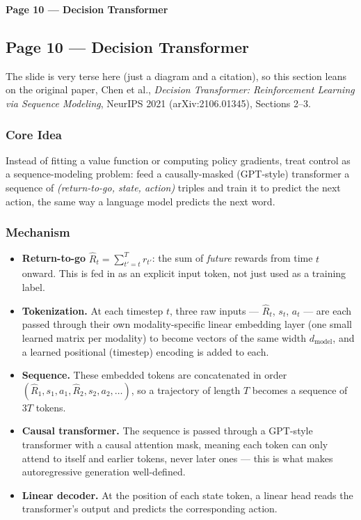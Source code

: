 \bigskip

\textbf{Page 10 --- Decision Transformer}

\subsection*{Page 10 --- Decision Transformer}

The slide is very terse here (just a diagram and a citation), so this section leans on the original paper, Chen et al., \emph{Decision Transformer: Reinforcement Learning via Sequence Modeling}, NeurIPS 2021 (arXiv:2106.01345), Sections 2--3.

\subsubsection*{Core Idea}

Instead of fitting a value function or computing policy gradients, treat control as a sequence-modeling problem: feed a causally-masked (GPT-style) transformer a sequence of \emph{(return-to-go, state, action)} triples and train it to predict the next action, the same way a language model predicts the next word.

\subsubsection*{Mechanism}

\begin{itemize}
\item \textbf{Return-to-go} $\hat R_t = \sum_{t'=t}^{T} r_{t'}$: the sum of \emph{future} rewards from time $t$ onward. This is fed in as an explicit input token, not just used as a training label.
\item \textbf{Tokenization.} At each timestep $t$, three raw inputs --- $\hat R_t$, $s_t$, $a_t$ --- are each passed through their own modality-specific linear embedding layer (one small learned matrix per modality) to become vectors of the same width $d_{\text{model}}$, and a learned positional (timestep) encoding is added to each.
\item \textbf{Sequence.} These embedded tokens are concatenated in order $(\hat R_1, s_1, a_1, \hat R_2, s_2, a_2, \dots)$, so a trajectory of length $T$ becomes a sequence of $3T$ tokens.
\item \textbf{Causal transformer.} The sequence is passed through a GPT-style transformer with a causal attention mask, meaning each token can only attend to itself and earlier tokens, never later ones --- this is what makes autoregressive generation well-defined.
\item \textbf{Linear decoder.} At the position of each state token, a linear head reads the transformer's output and predicts the corresponding action.
\end{itemize}

